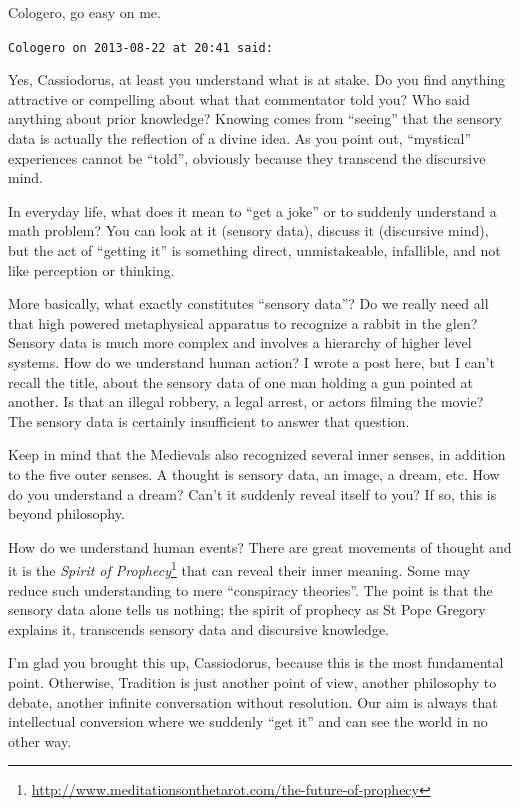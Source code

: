 \begin{footnotesize}
\begin{sffamily}
Cologero, go easy on me.

\hfill

\texttt{Cologero on 2013-08-22 at 20:41 said:}

Yes, Cassiodorus, at least you understand what is at stake. Do you find anything attractive or compelling about what that commentator told you? Who said anything about prior knowledge? Knowing comes from ``seeing'' that the sensory data is actually the reflection of a divine idea. As you point out, ``mystical'' experiences cannot be ``told'', obviously because they transcend the discursive mind.

In everyday life, what does it mean to ``get a joke'' or to suddenly understand a math problem? You can look at it (sensory data), discuss it (discursive mind), but the act of ``getting it'' is something direct, unmistakeable, infallible, and not like perception or thinking.

More basically, what exactly constitutes ``sensory data''? Do we really need all that high powered metaphysical apparatus to recognize a rabbit in the glen? Sensory data is much more complex and involves a hierarchy of higher level systems. How do we understand human action? I wrote a post here, but I can't recall the title, about the sensory data of one man holding a gun pointed at another. Is that an illegal robbery, a legal arrest, or actors filming the movie? The sensory data is certainly insufficient to answer that question.

Keep in mind that the Medievals also recognized several inner senses, in addition to the five outer senses. A thought is sensory data, an image, a dream, etc. How do you understand a dream? Can't it suddenly reveal itself to you? If so, this is beyond philosophy.

How do we understand human events? There are great movements of thought and it is the \textit{Spirit of Prophecy}\footnote{\url{http://www.meditationsonthetarot.com/the-future-of-prophecy}} that can reveal their inner meaning. Some may reduce such understanding to mere ``conspiracy theories''. The point is that the sensory data alone tells us nothing; the spirit of prophecy as St Pope Gregory explains it, transcends sensory data and discursive knowledge.

I'm glad you brought this up, Cassiodorus, because this is the most fundamental point. Otherwise, Tradition is just another point of view, another philosophy to debate, another infinite conversation without resolution. Our aim is always that intellectual conversion where we suddenly ``get it'' and can see the world in no other way.


\end{sffamily}
\end{footnotesize}
